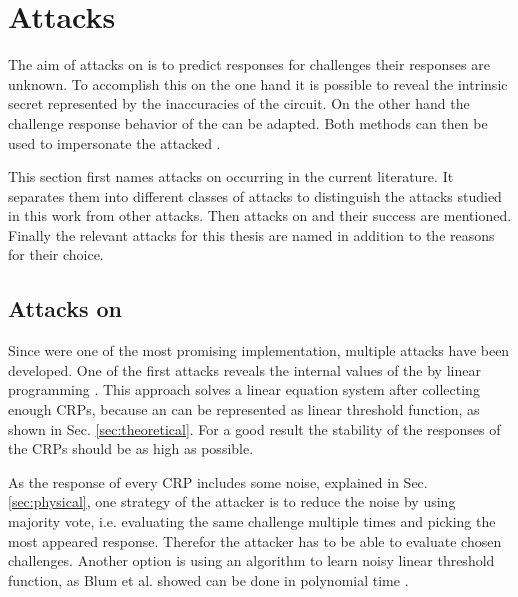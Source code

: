 \chapter{Attacks}
\label{cap:attacks}

The aim of attacks on \apuf is to predict responses for challenges their responses are unknown.
To accomplish this on the one hand it is possible to reveal the intrinsic secret represented by the inaccuracies of the \apuf circuit.
On the other hand the challenge response behavior of the \puf can be adapted.
Both methods can then be used to impersonate the attacked \puf.

This section first names attacks on \apufs occurring in the current literature.
It separates them into different classes of attacks to distinguish the attacks studied in this work from other attacks.
Then attacks on \xpufs and their success are mentioned.
Finally the relevant attacks for this thesis are named in addition to the reasons for their choice.


\section{Attacks on \apufs}
\label{sec:attacksonarbiter}

Since \apufs were one of the most promising \puf implementation, multiple attacks have been developed.
One of the first attacks reveals the internal values of the \apuf by linear programming \cite{Ozturk2008TowardsDevices}.
This approach solves a linear equation system after collecting enough \acp{CRP}, because an \apuf can be represented as linear threshold function, as shown in Sec. \ref{sec:theoretical}. %
For a good result the stability of the responses of the \acp{CRP} should be as high as possible.

As the response of every \ac{CRP} includes some noise, explained in Sec. \ref{sec:physical}, one strategy of the attacker is to reduce the noise by using majority vote, i.e. evaluating the same challenge multiple times and picking the most appeared response.
Therefor the attacker has to be able to evaluate chosen challenges. %
Another option is using an algorithm to learn noisy linear threshold function, as Blum et al. showed can be done in polynomial time \cite{Blum1998AlgorithmicaNoisy}.


